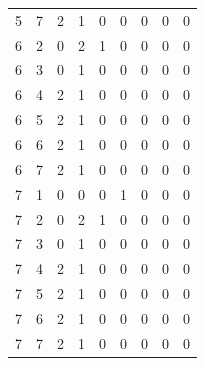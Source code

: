 \begin{center}
\begin{longtable}{ccrrrrrrr}
5 & 7 & 2 & 1 & 0 & 0 & 0 & 0 & 0\\
6 & 2 & 0 & 2 & 1 & 0 & 0 & 0 & 0\\
6 & 3 & 0 & 1 & 0 & 0 & 0 & 0 & 0\\
6 & 4 & 2 & 1 & 0 & 0 & 0 & 0 & 0\\
6 & 5 & 2 & 1 & 0 & 0 & 0 & 0 & 0\\
6 & 6 & 2 & 1 & 0 & 0 & 0 & 0 & 0\\
6 & 7 & 2 & 1 & 0 & 0 & 0 & 0 & 0\\
7 & 1 & 0 & 0 & 0 & 1 & 0 & 0 & 0\\
7 & 2 & 0 & 2 & 1 & 0 & 0 & 0 & 0\\
7 & 3 & 0 & 1 & 0 & 0 & 0 & 0 & 0\\
7 & 4 & 2 & 1 & 0 & 0 & 0 & 0 & 0\\
7 & 5 & 2 & 1 & 0 & 0 & 0 & 0 & 0\\
7 & 6 & 2 & 1 & 0 & 0 & 0 & 0 & 0\\
7 & 7 & 2 & 1 & 0 & 0 & 0 & 0 & 0\\
\bottomrule\end{longtable}\end{center}
